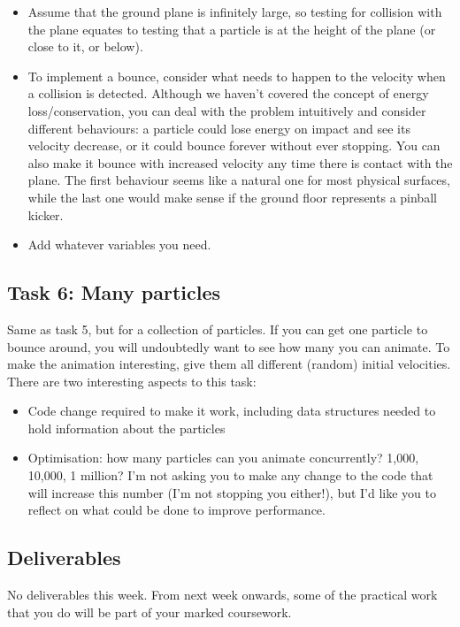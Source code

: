 \documentclass[12pt]{article}
\begin{document}
\begin{itemize}
\item Assume that the ground plane is infinitely large, so testing for collision with the plane equates to testing that a particle is at the height of the plane (or close to it, or below). 
\item To implement a bounce, consider what needs to happen to the velocity when a collision is detected. Although we haven't covered the concept of energy loss/conservation, you can deal with the problem intuitively and consider different behaviours: a particle could lose energy on impact and see its velocity decrease, or it could bounce forever without ever stopping. You can also make it bounce with increased velocity any time there is contact with the plane. The first behaviour seems like a natural one for most physical surfaces, while the last one would make sense if the ground floor represents a pinball kicker.
\item Add whatever variables you need.
\end{itemize}

\subsection*{Task 6: Many particles}

Same as task 5, but for a collection of particles. If you can get one particle to bounce around, you will undoubtedly want to see how many you can animate. To make the animation interesting, give them all different (random) initial velocities. There are two interesting aspects to this task: 

\begin{itemize}
\item Code change required to make it work, including data structures needed to hold information about the particles
\item Optimisation: how many particles can you animate concurrently? 1,000, 10,000, 1 million? I’m not asking you to make any change to the code that will increase this number (I'm not stopping you either!), but I’d like you to reflect on what could be done to improve performance.
\end{itemize}

\subsection*{Deliverables}

No deliverables this week. From next week onwards, some of the practical work that you do will be part of your marked coursework.
\end{document}
